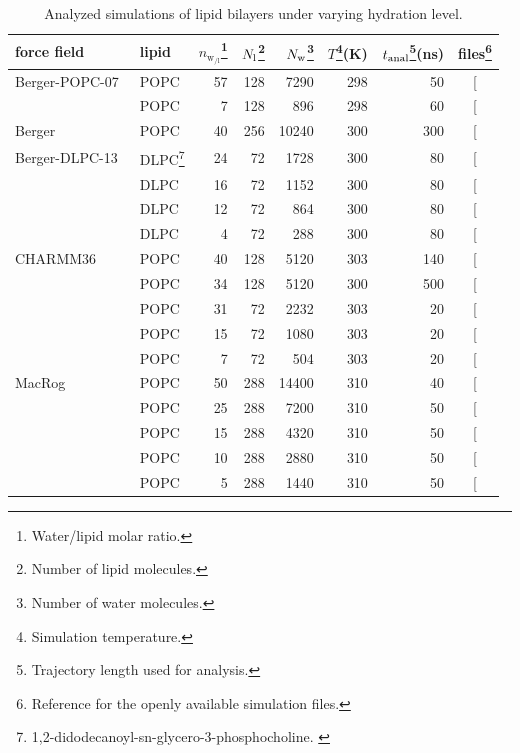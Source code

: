 \documentclass[journal=jcisd8,manuscript=article,layout=twocolumn]{achemso}
\begin{document}
\begin{table}[]
\caption{Analyzed simulations of lipid bilayers under varying hydration level.}
\begin{minipage}[t]{\columnwidth}
\resizebox{\columnwidth}{!} {
\begin{tabular}{llrrrrrc}
force field  &
lipid  &
$n_{{\mathrm w\!}_{/\mathrm l}}$\footnote{Water/lipid molar ratio.}  &
$N_{\rm l}$\footnote{Number of lipid molecules.}  &
$N_{\rm w}$\footnote{Number of water molecules.} &
$T$\footnote{Simulation temperature.}(K)  &
$t_{{\rm anal}}$\footnote{Trajectory length used for analysis.}(ns) &
files\footnote{Reference for the openly available simulation files.} \tabularnewline
\hline 
Berger-POPC-07~\cite{ollila07a} 
	& POPC  & 57  & 128  & 7290  & 298  & 50 & {[}\!\!\citenum{bergerFILESpopc}{]} \tabularnewline
	& POPC  & 7  & 128  & 896  & 298  & 60  & {[}\!\!\citenum{bergerDEHYDfiles}{]} \tabularnewline	
Berger~\cite{berger97,bachar04}
	& POPC & 40 & 256 & 10240 & 300 & 300  & {[}\!\!\citenum{bergerFILESpopcT300}{]} \tabularnewline[1.0ex]		
Berger-DLPC-13~\cite{kanduc13}
	& DLPC\footnote{1,2-didodecanoyl-sn-glycero-3-phosphocholine. \label{fn:DLPC}}  & 24  & 72  & 1728  & 300  & 80  & {[}\!\!\citenum{bergerFILESdlpc24}{]} \tabularnewline
	& DLPC\footref{fn:DLPC}  & 16  & 72  & 1152  & 300  & 80  & {[}\!\!\citenum{bergerFILESdlpc16}{]} \tabularnewline
	& DLPC\footref{fn:DLPC}  & 12  & 72  & 864  & 300  & 80  & {[}\!\!\citenum{bergerFILESdlpc12}{]} \tabularnewline
	& DLPC\footref{fn:DLPC}  & 4  & 72  & 288  & 300  & 80  & {[}\!\!\citenum{bergerFILESdlpc4}{]} \tabularnewline[1.0ex]
	
CHARMM36\cite{klauda10} 
	& POPC  & 40  & 128  & 5120  & 303  & 140 & {[}\!\!\citenum{charmm36files}{]} \tabularnewline
	& POPC  & 34	&  128  & 5120 & 300 & 500  & {[}\!\!\citenum{macrogfilesT300}{]}\tabularnewline[1.0ex]	
	& POPC  & 31 & 72 & 2232 & 303 & 20 & {[}\!\!\citenum{charmm36files31wPERl}{]}\tabularnewline[1.0ex]	
	& POPC  & 15  & 72  & 1080  & 303  & 20  & {[}\!\!\citenum{charmm36files15wPERl}{]} \tabularnewline
	& POPC  & 7  & 72  & 504  & 303  & 20  & {[}\!\!\citenum{charmm36files7wPERl}{]} \tabularnewline[1.0ex]
MacRog\cite{kulig15} 
	& POPC  & 50  & 288  & 14400  & 310  & 40  & {[}\!\!\citenum{macrogdehydFILES}{]} \tabularnewline
	& POPC  & 25  & 288  & 7200  & 310  & 50  & {[}\!\!\citenum{macrogdehydFILES}{]} \tabularnewline	
	& POPC  & 15  & 288  & 4320  & 310  & 50 & {[}\!\!\citenum{macrogdehydFILES}{]} \tabularnewline
	& POPC  & 10  & 288  & 2880  & 310  & 50  & {[}\!\!\citenum{macrogdehydFILES}{]} \tabularnewline
	& POPC  & 5  & 288  & 1440  & 310  & 50  & {[}\!\!\citenum{macrogdehydFILES}{]} \tabularnewline
\end{tabular}
}
\label{tab:hydr}
\end{minipage}

\end{table}
\end{document}
